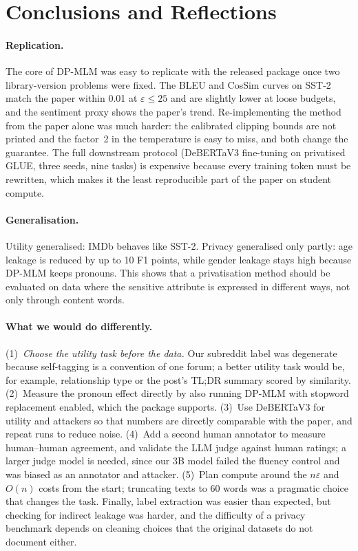 \documentclass[11pt]{article}
\begin{document}
\section{Conclusions and Reflections}
\label{sec:conclusion}
\paragraph{Replication.} The core of DP-MLM was easy to replicate with the released package once two library-version problems were fixed. The BLEU and CosSim curves on SST-2 match the paper within 0.01 at $\varepsilon \le 25$ and are slightly lower at loose budgets, and the sentiment proxy shows the paper's trend. Re-implementing the method from the paper alone was much harder: the calibrated clipping bounds are not printed and the factor~2 in the temperature is easy to miss, and both change the guarantee. The full downstream protocol (DeBERTaV3 fine-tuning on privatised GLUE, three seeds, nine tasks) is expensive because every training token must be rewritten, which makes it the least reproducible part of the paper on student compute.

\paragraph{Generalisation.} Utility generalised: IMDb behaves like SST-2. Privacy generalised only partly: age leakage is reduced by up to 10 F1 points, while gender leakage stays high because DP-MLM keeps pronouns. This shows that a privatisation method should be evaluated on data where the sensitive attribute is expressed in different ways, not only through content words.

\paragraph{What we would do differently.} (1)~\emph{Choose the utility task before the data.} Our subreddit label was degenerate because self-tagging is a convention of one forum; a better utility task would be, for example, relationship type or the post's TL;DR summary scored by similarity. (2)~Measure the pronoun effect directly by also running DP-MLM with stopword replacement enabled, which the package supports. (3)~Use DeBERTaV3 for utility and attackers so that numbers are directly comparable with the paper, and repeat runs to reduce noise. (4)~Add a second human annotator to measure human--human agreement, and validate the LLM judge against human ratings; a larger judge model is needed, since our 3B model failed the fluency control and was biased as an annotator and attacker. (5)~Plan compute around the $n\varepsilon$ and $O(n)$ costs from the start; truncating texts to 60 words was a pragmatic choice that changes the task. Finally, label extraction was easier than expected, but checking for indirect leakage was harder, and the difficulty of a privacy benchmark depends on cleaning choices that the original datasets do not document either.
\end{document}

